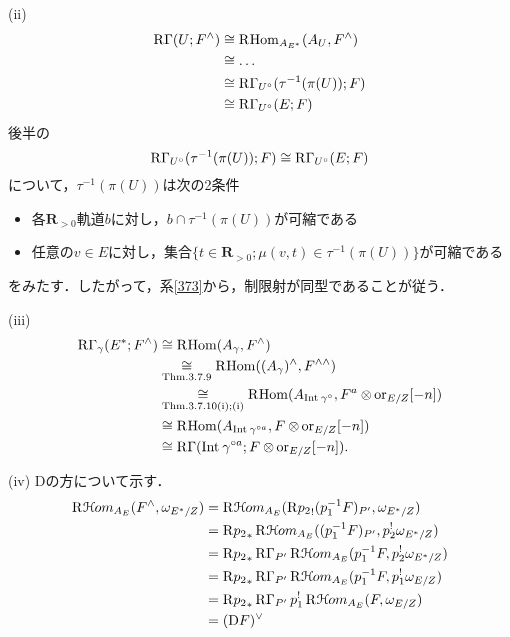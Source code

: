 \documentclass[uplatex,dvipdfmx,a4paper,10pt,draft]{jsarticle}
\makeatletter
\theoremstyle{definition}
\newcommand{\rr}{\mathbf{R}}
\newcommand{\Hom}{\mathop{\mathrm{Hom}}\nolimits} %
\renewenvironment{proof}[1][\proofname]{\par
  \pushQED{\qed}%
  \normalfont \topsep6\p@\@plus6\p@\relax
  \trivlist
  \item[\hskip\labelsep
         \bfseries
    {#1}]\ignorespaces
}{%
  \popQED\endtrivlist\@endpefalse
}
\renewcommand{\proofname}{証明.}
\numberwithin{equation}{section}
\newcommand{\HOM}{\mathop{\mathcal{H}\hspace{-0.5pt}om}\nolimits}%
\newcommand{\RHOM}{\mathop{\mathrm{R}\hspace{-1.5pt}\HOM}\nolimits}
\newcommand{\RG}{\mathop{\mathrm{R}\hspace{-0pt}\Gamma}\nolimits}
\newcommand{\RHom}{\mathop{\mathrm{R}\hspace{-1.5pt}\Hom}\nolimits}
\newcommand{\Rder}{\mathrm{R}}
\newcommand{\rmD}{\mathrm{D}}
\newcommand{\ori}{\mathord{\mathrm{or}}}
\newcommand{\tens}[1][]{\mathbin{\otimes_{\raise1.5ex\hbox to-.1em{}{#1}}}}
\theoremstyle{mystyle}
\newcommand{\Int}[1][]{\mathop{\mathrm{Int}}\nolimits_{#1}}
\newcommand{\rrp}{\rr_{>0}}
\makeatother
\begin{document}
\begin{proof}
    (ii) 
    \begin{align*}
        \RG(U;F^{\wedge})
        &\cong \RHom_{A_{E^{\ast}}}(A_{U},F^{\wedge})\\
        &\cong \dots\\
        &\cong \RG_{U^{\circ}}(\tau^{-1}(\pi(U));F)\\
        &\cong \RG_{U^{\circ}}(E;F)
    \end{align*}
    後半の\[
        \RG_{U^{\circ}}(\tau^{-1}(\pi(U));F)
        \cong 
        \RG_{U^{\circ}}(E;F)
    \]について，\(\tau^{-1}(\pi(U))\)は次の2条件
    \begin{itemize}
        \item 各\(\rrp\)軌道\(b\)に対し，\(b\cap \tau^{-1}(\pi(U))\)が可縮である
        \item 任意の\(v\in E\)に対し，集合\(\{t\in\rrp;\mu(v,t)\in\tau^{-1}(\pi(U))\}\)が可縮である
    \end{itemize}
    をみたす．したがって，系\ref{373}から，制限射が同型であることが従う．

    (iii) 
    \begin{align*}
        \RG_{\gamma}(E^{\ast};F^{\wedge})
        &\cong\RHom(A_{\gamma},F^{\wedge})\\
        &\underset{\text{Thm.3.7.9}}{\cong}\RHom((A_{\gamma})^{\wedge},F^{\wedge\wedge})\\
        &\underset{\text{Thm.3.7.10(i);(i)}}{\cong}\RHom(A_{\Int{\gamma^{\circ}}},F^a\tens \ori_{E/Z}[-n])\\
        &\cong\RHom(A_{\Int{\gamma^{\circ a}}},F\tens \ori_{E/Z}[-n])\\
        &\cong\RG({\Int{\gamma^{\circ a}}};F\tens \ori_{E/Z}[-n]).
    \end{align*}

    (iv) 
    \(\rmD\)の方について示す．
    \begin{align*}
        \RHOM_{A_{E}}(F^{\wedge},\omega_{E^{\ast}/Z})
        &=\RHOM_{A_{E}}(\Rder{{p_{2}}_{!}}(p_{1}^{-1}F)_{P'},\omega_{E^{\ast}/Z})\\
        &=\Rder{{p_{2}}_{\ast}}\RHOM_{A_{E}}((p_{1}^{-1}F)_{P'},p_{2}^{!}\omega_{E^{\ast}/Z})\\
        &=\Rder{{p_{2}}_{\ast}}\RG_{P'}\RHOM_{A_{E}}(p_{1}^{-1}F,p_{2}^{!}\omega_{E^{\ast}/Z})\\
        &=\Rder{{p_{2}}_{\ast}}\RG_{P'}\RHOM_{A_{E}}(p_{1}^{-1}F,p_{1}^{!}\omega_{E/Z})\\
        &=\Rder{{p_{2}}_{\ast}}\RG_{P'}p_{1}^{!}\RHOM_{A_{E}}(F,\omega_{E/Z})\\
        &=(\rmD{F})^{\vee}
    \end{align*}
\end{proof}
\end{document}
